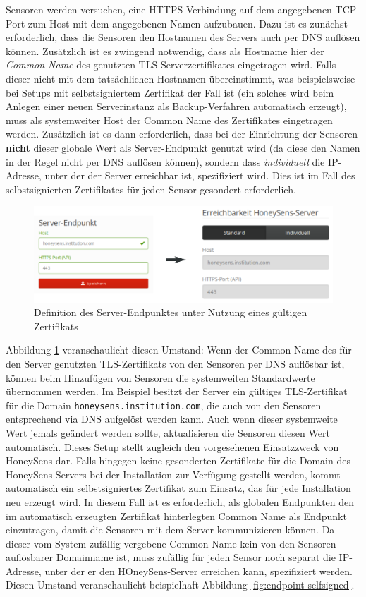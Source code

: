 \documentclass[12pt]{article}
\begin{document}
Sensoren werden versuchen, eine HTTPS-Verbindung auf dem angegebenen TCP-Port zum Host mit dem angegebenen Namen aufzubauen. Dazu ist es zunächst erforderlich, dass die Sensoren den Hostnamen des Servers auch per DNS auflösen können. Zusätzlich ist es zwingend notwendig, dass als Hostname hier der \textit{Common Name} des genutzten TLS-Serverzertifikates eingetragen wird. Falls dieser nicht mit dem tatsächlichen Hostnamen übereinstimmt, was beispielsweise bei Setups mit selbstsigniertem Zertifikat der Fall ist (ein solches wird beim Anlegen einer neuen Serverinstanz als Backup-Verfahren automatisch erzeugt), muss als systemweiter Host der Common Name des Zertifikates eingetragen werden. Zusätzlich ist es dann erforderlich, dass bei der Einrichtung der Sensoren \textbf{nicht} dieser globale Wert als Server-Endpunkt genutzt wird (da diese den Namen in der Regel nicht per DNS auflösen können), sondern dass \textit{individuell} die IP-Adresse, unter der der Server erreichbar ist, spezifiziert wird. Dies ist im Fall des selbstsignierten Zertifikates für jeden Sensor gesondert erforderlich.

\begin{figure}[h]
				\centering
				\includegraphics[width=\textwidth]{./graphics/endpoint-cert.png}
				\caption{Definition des Server-Endpunktes unter Nutzung eines gültigen Zertifikats}
				\label{fig:endpoint-cert}
\end{figure}

Abbildung \ref{fig:endpoint-cert} veranschaulicht diesen Umstand: Wenn der Common Name des für den Server genutzten TLS-Zertifikats von den Sensoren per DNS auflösbar ist, können beim Hinzufügen von Sensoren die systemweiten Standardwerte übernommen werden. Im Beispiel besitzt der Server ein gültiges TLS-Zertifikat für die Domain \verb|honeysens.institution.com|, die auch von den Sensoren entsprechend via DNS aufgelöst werden kann. Auch wenn dieser systemweite Wert jemals geändert werden sollte, aktualisieren die Sensoren diesen Wert automatisch. Dieses Setup stellt zugleich den vorgesehenen Einsatzzweck von HoneySens dar. Falls hingegen keine gesonderten Zertifikate für die Domain des HoneySens-Servers bei der Installation zur Verfügung gestellt werden, kommt automatisch ein selbstsigniertes Zertifikat zum Einsatz, das für jede Installation neu erzeugt wird. In diesem Fall ist es erforderlich, als globalen Endpunkten den im automatisch erzeugten Zertifikat hinterlegten Common Name als Endpunkt einzutragen, damit die Sensoren mit dem Server kommunizieren können. Da dieser vom System zufällig vergebene Common Name kein von den Sensoren auflösbarer Domainname ist, muss zufällig für jeden Sensor noch separat die IP-Adresse, unter der er den HOneySens-Server erreichen kann, spezifiziert werden. Diesen Umstand veranschaulicht beispielhaft Abbildung \ref{fig:endpoint-selfsigned}.
\end{document}

